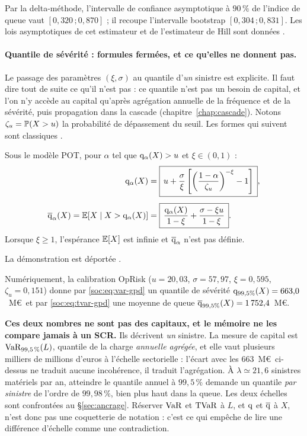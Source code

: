 \noindent Par la delta-méthode, l'intervalle de confiance asymptotique à $90\,\%$ de l'indice de
queue vaut $[0{,}320\,;0{,}870]$ ; il recoupe l'intervalle bootstrap $[0{,}304\,;0{,}831]$. Les
lois asymptotiques de cet estimateur et de l'estimateur de Hill sont données
\matcomp.

\paragraph{Quantile de sévérité : formules fermées, et ce qu'elles ne donnent pas.} Le passage des paramètres $(\xi,\sigma)$ au quantile d'\emph{un} sinistre est explicite. Il faut dire tout de suite ce qu'il n'est pas : ce quantile n'est pas un besoin de capital, et l'on n'y accède au capital qu'après agrégation annuelle de la fréquence et de la sévérité, puis propagation dans la cascade (chapitre~\ref{chap:cascade}). Notons $\zeta_u=\mathbb{P}(X>u)$ la probabilité de dépassement du seuil. Les formes qui suivent sont
classiques \citep{mcneil2015}.

\begin{proposition}\label{soc:prop:varestvar}
Sous le modèle POT, pour $\alpha$ tel que $\mathrm{q}_\alpha(X)>u$ et $\xi\in(0,1)$ :
\begin{align}
\mathrm{q}_\alpha(X) &= \boxed{\,u + \frac{\sigma}{\xi}\left[\left(\frac{1-\alpha}{\zeta_u}\right)^{-\xi}-1\right]\,},\label{soc:eq:var-gpd}\\[4pt]
\overline{\mathrm{q}}_\alpha(X) = \mathbb{E}[X\mid X>\mathrm{q}_\alpha(X)] &= \boxed{\,\frac{\mathrm{q}_\alpha(X)}{1-\xi}+\frac{\sigma-\xi u}{1-\xi}\,}.\label{soc:eq:tvar-gpd}
\end{align}
Lorsque $\xi\ge 1$, l'espérance $\mathbb{E}[X]$ est infinie et $\overline{\mathrm{q}}_\alpha$ n'est pas définie.
\end{proposition}

\noindent La démonstration est déportée \matcomp.

\noindent Numériquement, la calibration OpRisk ($u=20{,}03$, $\sigma=57{,}97$, $\xi=0{,}595$, $\zeta_u=0{,}151$) donne par \eqref{soc:eq:var-gpd} un quantile de sévérité $\mathrm{q}_{99{,}5\%}(X)=663{,}0$~M\euro\ et par \eqref{soc:eq:tvar-gpd} une moyenne de queue $\overline{\mathrm{q}}_{99{,}5\%}(X)=1\,752{,}4$~M\euro.

\begin{attention}
\textbf{Ces deux nombres ne sont pas des capitaux, et le mémoire ne les compare jamais à un SCR.}
Ils décrivent \emph{un} sinistre. La mesure de capital est $\mathrm{VaR}_{99{,}5\,\%}(L)$, quantile de la
charge \emph{annuelle agrégée}, et elle vaut plusieurs milliers de millions d'euros à l'échelle
sectorielle : l'écart avec les $663$~M\euro\ ci-dessus ne traduit aucune incohérence, il traduit
l'agrégation. À $\lambda\simeq21{,}6$ sinistres matériels par an, atteindre le quantile annuel à
$99{,}5\,\%$ demande un quantile \emph{par sinistre} de l'ordre de $99{,}98\,\%$, bien plus haut
dans la queue. Les deux échelles sont confrontées au \S\ref{sec:ancrage}.
Réserver $\mathrm{VaR}$ et $\mathrm{TVaR}$ à $L$, et $\mathrm{q}$ et $\overline{\mathrm{q}}$ à
$X$, n'est donc pas une coquetterie de notation : c'est ce qui empêche de lire une différence
d'échelle comme une contradiction.
\end{attention}

